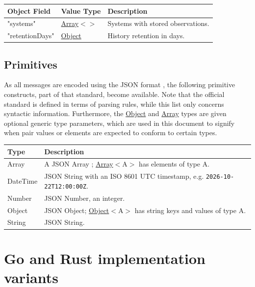 \documentclass[a4paper]{arrowhead}
\newcommand{\pdef}[1]{{\textcolor{ArrowheadGrey}{#1 \label{sec:model:primitives:#1} \label{sec:model:primitives:#1s}}}}
\newcommand{\pref}[1]{{\textcolor{ArrowheadGrey}{\hyperref[sec:model:primitives:#1]{#1}}}}
\begin{document}




\noindent\begin{tabularx}{\textwidth}{| >{\raggedright\arraybackslash}p{3.9cm} | >{\raggedright\arraybackslash\small}p{5.3cm} | X |} \hline
\rowcolor{gray!33} Object Field & Value Type & Description \\ \hline
"systems" & \pref{Array}$<$\allowbreak{}\pref{String}$>$ & Systems with stored observations. \\ \hline
"retention\allowbreak{}Days" & \pref{Object} & History retention in days. \\ \hline
\end{tabularx}



\subsection{Primitives}
\label{sec:model:primitives}

As all messages are encoded using the JSON format \cite{rfc8259}, the following primitive constructs, part of that standard, become available.
Note that the official standard is defined in terms of parsing rules, while this list only concerns syntactic information.
Furthermore, the \pref{Object} and \pref{Array} types are given optional generic type parameters, which are used in this document to signify when pair values or elements are expected to conform to certain types.

\noindent\begin{tabularx}{\textwidth}{| p{4.6cm} | X |} \hline
\rowcolor{gray!33} Type & Description \\ \hline
\pdef{Array} & A JSON Array \cite{rfc8259}; \pref{Array}$<$A$>$ has elements of type A. \\ \hline
\pdef{DateTime} & JSON String with an ISO 8601 UTC timestamp, e.g. \texttt{2026-10-22T12:00:00Z}. \\ \hline
\pdef{Number} & JSON Number, an integer. \\ \hline
\pdef{Object} & JSON Object; \pref{Object}$<$A$>$ has string keys and values of type A. \\ \hline
\pdef{String} & JSON String. \\ \hline
\end{tabularx}

\newpage

\section{Go and Rust implementation variants}
\end{document}
